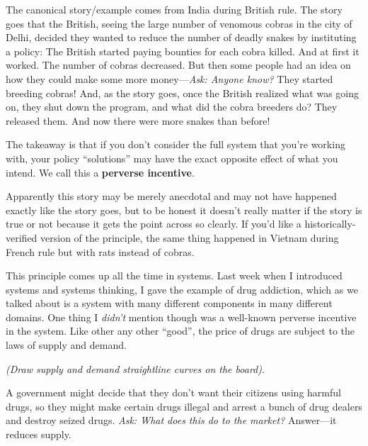 \documentclass[11pt]{article}
\begin{document}
The canonical story/example comes from India during British rule. The story goes that the British, seeing the large number of venomous cobras in the city of Delhi, decided they wanted to reduce the number of deadly snakes by instituting a policy: The British started paying bounties for each cobra killed. And at first it worked. The number of cobras decreased. But then some people had an idea on how they could make some more money---{\it Ask: Anyone know?} They started breeding cobras! And, as the story goes, once the British realized what was going on, they shut down the program, and what did the cobra breeders do? They released them. And now there were more snakes than before!

The takeaway is that if you don't consider the full system that you're working with, your policy ``solutions'' may have the exact opposite effect of what you intend. We call this a {\bf perverse incentive}.

Apparently this story may be merely anecdotal and may not have happened exactly like the story goes, but to be honest it doesn't really matter if the story is true or not because it gets the point across so clearly. If you'd like a historically-verified version of the principle, the same thing happened in Vietnam during French rule but with rats instead of cobras.

This principle comes up all the time in systems. Last week when I introduced systems and systems thinking, I gave the example of drug addiction, which as we talked about is a system with many different components in many different domains. One thing I {\it didn't} mention though was a well-known perverse incentive in the system. Like other any other ``good'', the price of drugs are subject to the laws of supply and demand. %

{\it (Draw supply and demand straightline curves on the board)}. 

A government might decide that they don't want their citizens using harmful drugs, so they might make certain drugs illegal and arrest a bunch of drug dealers and destroy seized drugs. {\it Ask: What does this do to the market?} Answer---it reduces supply.
\end{document}
